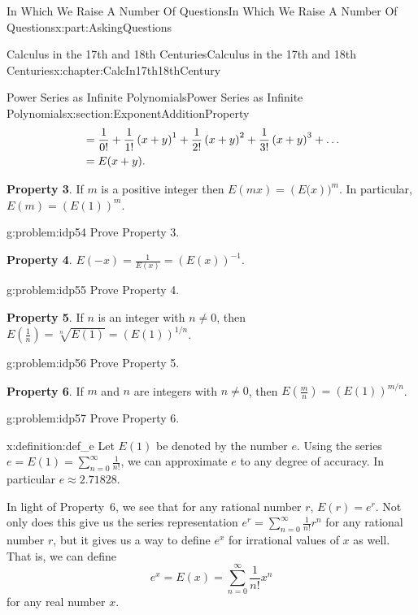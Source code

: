 \documentclass[oneside,10pt,]{book}
\newcommand{\terminology}[1]{\textbf{#1}}
\numberwithin{equation}{section}
\newcommand{\amp}{&}
\begin{document}
\begin{partptx}{In Which We Raise A Number Of Questions}{}{In Which We Raise A Number Of Questions}{}{}{x:part:AskingQuestions}
\begin{chapterptx}{Calculus in the 17th and 18th Centuries}{}{Calculus in the 17th and 18th Centuries}{}{}{x:chapter:CalcIn17th18thCentury}
\begin{sectionptx}{Power Series as Infinite Polynomials}{}{Power Series as Infinite Polynomials}{}{}{x:section:ExponentAdditionProperty}
\begin{align}
\amp =\frac{1}{0!}+\frac{1}{1!}\left(x+y\right)^1+\frac{1}{2!}\left(x+y\right)^2+\frac{1}{3!}\left(x+y\right)^3+\ldots\notag\\
\amp =E(x+y)\text{.}\label{x:mrow:eq_ExponentAdditionProperty}
\end{align}
%
\par
{} \terminology{Property 3}. If \(m\) is a positive integer then \(E(mx)=\left(E(x\right))^m\). In particular, \(E(m)=\left(E(1)\right)^m\).%
\begin{problem}{}{g:problem:idp54}%
 Prove Property 3.%
\end{problem}
\terminology{Property 4}. \(E(-x)=\frac{1}{E(x)}=\left(E(x)\right)^{-1}\).%
\begin{problem}{}{g:problem:idp55}%
 Prove Property 4.%
\end{problem}
\terminology{Property 5}. If \(n\) is an integer with \(n\neq 0\), then \(E(\frac{1}{n})=\sqrt[n]{E(1)}=\left(E(1)\right)^{1/n}\).%
\begin{problem}{}{g:problem:idp56}%
 Prove Property 5.%
\end{problem}
\terminology{Property 6}. If \(m\) and \(n\) are integers with \(n\neq 0\), then \(E\left(\frac{m}{n}\right)=\left(E(1)\right)^{m/n}\).%
\begin{problem}{}{g:problem:idp57}%
 Prove Property 6.%
\end{problem}
\begin{definition}{}{x:definition:def_e}%
 Let \(E(1)\) be denoted by the number \(e\). Using the series \(e=E(1)=\sum_{n=0}^\infty\frac{1}{n!}\), we can approximate \(e\) to any degree of accuracy. In particular \(e\approx 2.71828\).%
\end{definition}
In light of Property~6, we see that for any rational number \(r\), \(E(r)=e^r\). Not only does this give us the series representation \(e^r=\sum_{n=0}^\infty\frac{1}{n!}r^n\) for any rational number \(r\), but it gives us a way to define \(e^x\) for irrational values of \(x\) as well. That is, we can define%
\begin{equation*}
e^x=E(x)=\sum_{n=0}^\infty\frac{1}{n!}x^n
\end{equation*}
for any real number \(x\).%
\par

\end{sectionptx}
\end{chapterptx}
\end{partptx}
\end{document}
